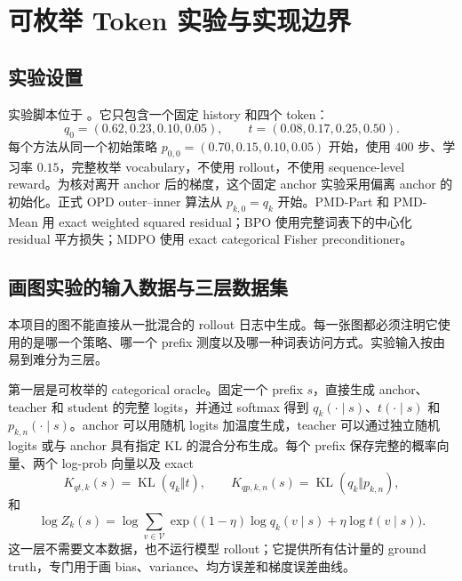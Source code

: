\section{可枚举 Token 实验与实现边界}
\label{evidence:toy}

\subsection{实验设置}

实验脚本位于 。它只包含一个固定 history 和四个 token：
\begin{equation}
 q_0=(0.62,0.23,0.10,0.05),
 \qquad
 t=(0.08,0.17,0.25,0.50).
\end{equation}
每个方法从同一个初始策略 $p_{0,0}=(0.70,0.15,0.10,0.05)$ 开始，使用 $400$ 步、学习率 $0.15$，完整枚举 vocabulary，不使用 rollout，不使用 sequence-level reward。为核对离开 anchor 后的梯度，这个固定 anchor 实验采用偏离 anchor 的初始化。正式 OPD outer--inner 算法从 $p_{k,0}=q_k$ 开始。PMD-Part 和 PMD-Mean 用 exact weighted squared residual；BPO 使用完整词表下的中心化 residual 平方损失；MDPO 使用 exact categorical Fisher preconditioner。

\subsection{画图实验的输入数据与三层数据集}

本项目的图不能直接从一批混合的 rollout 日志中生成。每一张图都必须注明它使用的是哪一个策略、哪一个 prefix 测度以及哪一种词表访问方式。实验输入按由易到难分为三层。

第一层是可枚举的 categorical oracle。固定一个 prefix $s$，直接生成 anchor、teacher 和 student 的完整 logits，并通过 softmax 得到 $q_k(\cdot\mid s)$、$t(\cdot\mid s)$ 和 $p_{k,n}(\cdot\mid s)$。anchor 可以用随机 logits 加温度生成，teacher 可以通过独立随机 logits 或与 anchor 具有指定 KL 的混合分布生成。每个 prefix 保存完整的概率向量、两个 log-prob 向量以及 exact
\begin{equation}
K_{qt,k}(s)=\operatorname{KL}(q_k\Vert t),\qquad K_{qp,k,n}(s)=\operatorname{KL}(q_k\Vert p_{k,n}),
\end{equation}
和
\begin{equation}
\log Z_k(s)=\log\sum_{v\in\mathcal V}\exp\bigl((1-\eta)\log q_k(v\mid s)+\eta\log t(v\mid s)\bigr).
\end{equation}
这一层不需要文本数据，也不运行模型 rollout；它提供所有估计量的 ground truth，专门用于画 bias、variance、均方误差和梯度误差曲线。

